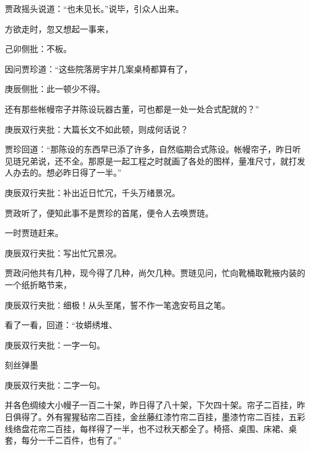 \begin{parag}
    贾政摇头说道：“也未见长。”说毕，引众人出来。
\end{parag}


\begin{parag}
    方欲走时，忽又想起一事来，\begin{note}己卯侧批：不板。\end{note}因问贾珍道：“这些院落房宇并几案桌椅都算有了，\begin{note}庚辰侧批：此一顿少不得。\end{note}还有那些帐幔帘子并陈设玩器古董，可也都是一处一处合式配就的？”\begin{note}庚辰双行夹批：大篇长文不如此顿，则成何话说？\end{note}贾珍回道：“那陈设的东西早已添了许多，自然临期合式陈设。帐幔帘子，昨日听见琏兄弟说，还不全。那原是一起工程之时就画了各处的图样，量准尺寸，就打发人办去的。想必昨日得了一半。”\begin{note}庚辰双行夹批：补出近日忙冗，千头万绪景况。\end{note}贾政听了，便知此事不是贾珍的首尾，便令人去唤贾琏。
\end{parag}


\begin{parag}
    一时贾琏赶来。\begin{note}庚辰双行夹批：写出忙冗景况。\end{note}贾政问他共有几种，现今得了几种，尚欠几种。贾琏见问，忙向靴桶取靴掖内装的一个纸折略节来，\begin{note}庚辰双行夹批：细极！从头至尾，誓不作一笔逸安苟且之笔。\end{note}看了一看，回道：“妆蟒绣堆、\begin{note}庚辰双行夹批：一字一句。\end{note}刻丝弹墨\begin{note}庚辰双行夹批：二字一句。\end{note}并各色绸绫大小幔子一百二十架，昨日得了八十架，下欠四十架。帘子二百挂，昨日俱得了。外有猩猩毡帘二百挂，金丝藤红漆竹帘二百挂，墨漆竹帘二百挂，五彩线络盘花帘二百挂，每样得了一半，也不过秋天都全了。椅搭、桌围、床裙、桌套，每分一千二百件，也有了。”
\end{parag}


